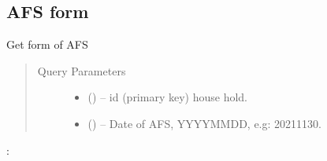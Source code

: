 \documentclass[letterpaper,10pt,english,openany,oneside]{sphinxmanual}
\begin{document}
\subsection{AFS form}
\label{\detokenize{api-last-mile/v1:afs-form}}

\begin{fulllineitems}
\label{\detokenize{api-last-mile/v1:get--api-last-smile-v1-AFS-form}}
\sphinxAtStartPar
Get form of AFS
\begin{quote}\begin{description}
\item[{Query Parameters}] \leavevmode\begin{itemize}
\item {} 
\sphinxAtStartPar
{} () – id (primary key) house hold.

\item {} 
\sphinxAtStartPar
{} () – Date of AFS, YYYY\sphinxhyphen{}MM\sphinxhyphen{}DD, e.g: 2021\sphinxhyphen{}11\sphinxhyphen{}30.

\end{itemize}

\end{description}\end{quote}

\sphinxAtStartPar
{}:


\end{fulllineitems}
\end{document}

